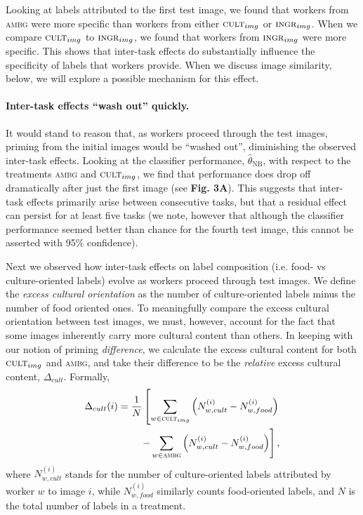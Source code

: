 \documentclass[letterpaper]{article}
\begin{document}
Looking at labels attributed to the first test image, we found that workers 
from \textsc{ambg} were more specific than workers from
either $\textsc{cult}_{img}$ or $\textsc{ingr}_{img}$.  When we compare 
$\textsc{cult}_{img}$ to $\textsc{ingr}_{img}$, we found that workers from
$\textsc{ingr}_{img}$ were more specific.  This shows that inter-task 
effects do substantially influence the specificity of labels that workers 
provide.  When we discuss image similarity, below, we will explore a possible
mechanism for this effect.
\paragraph{Inter-task effects ``wash out'' quickly.}  
It would stand to reason that, as workers proceed through the test images, 
priming from the initial images would be ``washed out'', diminishing the 
observed inter-task effects.
Looking at the classifier performance, $\hat{\theta}_\text{NB}$, with respect 
to the treatments \textsc{ambg} and $\textsc{cult}_{img}$, we find that 
performance does drop off dramatically after just the first image 
(see \textbf{Fig. 3A}).
This suggests that inter-task effects primarily arise between consecutive 
tasks, but that a residual effect can persist for at least five tasks (we 
note, however that although the classifier performance seemed better than 
chance for the fourth test image, this cannot be asserted with 95\% 
confidence).

Next we observed how inter-task effects on label composition (i.e. food- vs 
culture-oriented labels) evolve as workers proceed through test images.
We define the \textit{excess cultural orientation} as the number of 
culture-oriented labels minus the number of food oriented ones.  To 
meaningfully compare the excess cultural orientation between test images, we 
must, however, account for the fact that some images inherently carry more 
cultural content than others. In keeping with our notion of priming 
\textit{difference}, we calculate the excess cultural content for both 
$\textsc{cult}_{img}$ and \textsc{ambg}, and take their difference to be
the \textit{relative} excess cultural content, $\Delta_{cult}$.  Formally,
\begin{align}
	\begin{split}
	\Delta_{cult}(i) = \frac{1}{N}\left[ \sum_{w\in\textsc{cult}_{img}} \left(N_{w,cult}^{(i)} - N_{w,food}^{(i)}\right)\right. \\
\left.	- \sum_{w\in\textsc{ambg}} \left(N_{w,cult}^{(i)} - N_{w,food}^{(i)}\right)\right],
	\end{split}
\end{align}
where $N_{w,cult}^{(i)}$ stands for the number of culture-oriented labels 
attributed by worker $w$ to image $i$, while $N_{w,food}^{(i)}$ similarly 
counts food-oriented labels, and $N$ is the total number of labels in a 
treatment.  
\end{document}
